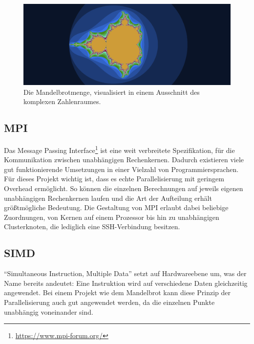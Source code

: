 \begin{figure}
	\centering
	\includegraphics[width=0.9\linewidth]{img/Einleitung/Mandelbrot_visualization_example.png}
	\caption{Die Mandelbrotmenge, visualisiert in einem Ausschnitt des komplexen Zahlenraumes.}
	\label{fig:mandelbrot_visualisierung_beispiel}
\end{figure}

\subsection{MPI}

Das Message Passing Interface\footnote{\url{https://www.mpi-forum.org/}} ist eine weit verbreitete Spezifikation, für die Kommunikation zwischen unabhängigen Rechenkernen.
Dadurch existieren viele gut funktionierende Umsetzungen in einer Vielzahl von Programmiersprachen.
Für dieses Projekt wichtig ist, dass es echte Parallelisierung mit geringem Overhead ermöglicht.
So können die einzelnen Berechnungen auf jeweils eigenen unabhängigen Rechenkernen laufen und
die Art der Aufteilung erhält größtmögliche Bedeutung.
Die Gestaltung von MPI erlaubt dabei beliebige Zuordnungen, von Kernen auf einem Prozessor bis hin zu unabhängigen Clusterknoten, die lediglich eine SSH-Verbindung besitzen.



\subsection{SIMD} \label{par:introduction_simd}

\enquote{Simultaneous Instruction, Multiple Data} setzt auf Hardwareebene um, was der Name bereits andeutet:
Eine Instruktion wird auf verschiedene Daten gleichzeitig angewendet.
Bei einem Projekt wie dem Mandelbrot kann diese Prinzip der Parallelisierung auch gut angewendet werden,
da die einzelnen Punkte unabhängig voneinander sind.

